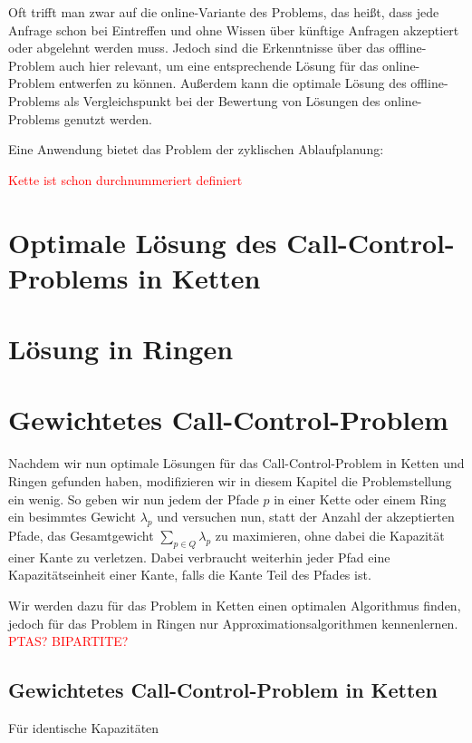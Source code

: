 \documentclass[11pt]{article}
\theoremstyle{definition}
\theoremstyle{theorem}
\theoremstyle{theorem}
\newcommand\todo[1]{\textcolor{red}{#1}}
\begin{document}
    Oft trifft man zwar auf die online-Variante des Problems, das heißt, dass jede Anfrage schon bei Eintreffen und
    ohne Wissen über künftige Anfragen akzeptiert oder abgelehnt werden muss.
    Jedoch sind die Erkenntnisse über das offline-Problem auch hier relevant, um eine entsprechende Lösung für das
    online-Problem entwerfen zu können.
    Außerdem kann die optimale Lösung des offline-Problems als Vergleichspunkt bei der Bewertung von Lösungen des
    online-Problems genutzt werden.

    Eine Anwendung bietet das Problem der zyklischen Ablaufplanung:

    \todo{Kette ist schon durchnummeriert definiert}

	\section{Optimale Lösung des Call-Control-Problems in Ketten}\label{sec:call-control-in-chains}
	

    \section{Lösung in Ringen}\label{sec:call-control-in-rings}
    

    \section{Gewichtetes Call-Control-Problem}\label{sec:weighted-call-control}
    Nachdem wir nun optimale Lösungen für das Call-Control-Problem in Ketten und Ringen gefunden haben, modifizieren
    wir in diesem Kapitel die Problemstellung ein wenig.
    So geben wir nun jedem der Pfade $p$ in einer Kette oder einem Ring ein besimmtes Gewicht $\lambda_p$ und versuchen
    nun, statt der Anzahl der akzeptierten Pfade, das Gesamtgewicht $\sum_{p\in Q}\lambda_p$ zu maximieren, ohne dabei
    die Kapazität einer Kante zu verletzen.
    Dabei verbraucht weiterhin jeder Pfad eine Kapazitätseinheit einer Kante, falls die Kante Teil des Pfades ist.

    Wir werden dazu für das Problem in Ketten einen optimalen Algorithmus finden, jedoch für das Problem in Ringen
    nur Approximationsalgorithmen kennenlernen. \todo{PTAS? BIPARTITE?}

    \subsection{Gewichtetes Call-Control-Problem in Ketten}
    Für identische Kapazitäten
\end{document}
